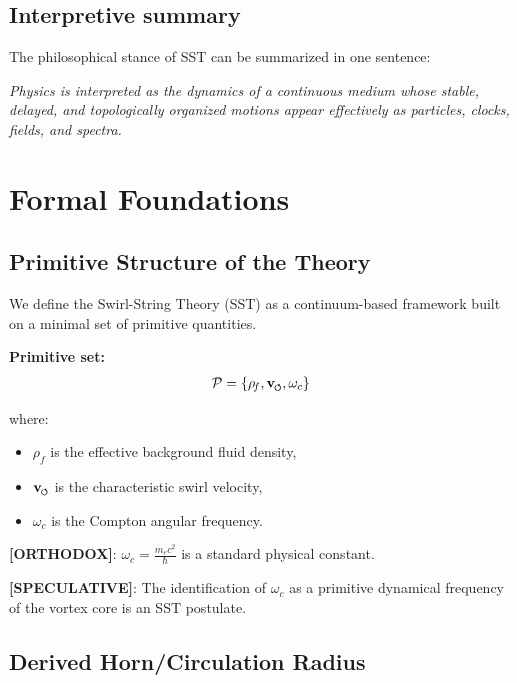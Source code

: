 \documentclass[11pt]{article}
\theoremstyle{definition}
\theoremstyle{plain}
\theoremstyle{remark}
\newcommand{\swirlarrow}{\mathchoice{\mkern-2mu\scriptstyle\boldsymbol{\circlearrowleft}}{\mkern-2mu\scriptstyle\boldsymbol{\circlearrowleft}}{\mkern-2mu\scriptscriptstyle\boldsymbol{\circlearrowleft}}{\mkern-2mu\scriptscriptstyle\boldsymbol{\circlearrowleft}}}
\newcommand{\vswirl}{\mathbf{v}_{\swirlarrow}}
\newcommand{\rhoF}{{\rho_{\!f}}}
\begin{document}
    \subsection{Interpretive summary}
        The philosophical stance of SST can be summarized in one sentence:
        \begin{center}
            \textit{Physics is interpreted as the dynamics of a continuous medium whose stable, delayed, and topologically organized motions appear effectively as particles, clocks, fields, and spectra.}
        \end{center}

\section{Formal Foundations}
    \label{sec:foundations}
    
    \subsection{Primitive Structure of the Theory}
        
        We define the Swirl-String Theory (SST) as a continuum-based framework built on a minimal set of primitive quantities.
        
        \textbf{Primitive set:}
        \begin{align}
            \mathcal{P} = \{ \rhoF, \vswirl, \omega_c \}
        \end{align}
        
        where:
        \begin{itemize}
            \item $\rhoF$ is the effective background fluid density,
            \item $\vswirl$ is the characteristic swirl velocity,
            \item $\omega_c$ is the Compton angular frequency.
        \end{itemize}
        
        \textbf{[ORTHODOX]}: $\omega_c = \frac{m_e c^2}{\hbar}$ is a standard physical constant.
        
        \textbf{[SPECULATIVE]}: The identification of $\omega_c$ as a primitive dynamical frequency of the vortex core is an SST postulate.
    
    \subsection{Derived Horn/Circulation Radius}
        \label{subsec:derived_horn_circulation_radius}
\end{document}

